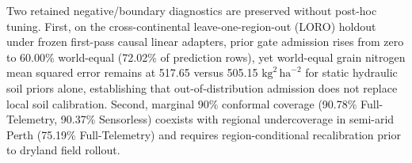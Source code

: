 \documentclass[10pt,a4paper]{article}
\begin{document}
Two retained negative/boundary diagnostics are preserved without post-hoc tuning. First, on the cross-continental leave-one-region-out (LORO) holdout under frozen first-pass causal linear adapters, prior gate admission rises from zero to 60.00\% world-equal (72.02\% of prediction rows), yet world-equal grain nitrogen mean squared error remains at 517.65 versus 505.15 $\mathrm{kg}^2\,\mathrm{ha}^{-2}$ for static hydraulic soil priors alone, establishing that out-of-distribution admission does not replace local soil calibration. Second, marginal 90\% conformal coverage (90.78\% Full-Telemetry, 90.37\% Sensorless) coexists with regional undercoverage in semi-arid Perth (75.19\% Full-Telemetry) and requires region-conditional recalibration prior to dryland field rollout.
\end{document}
